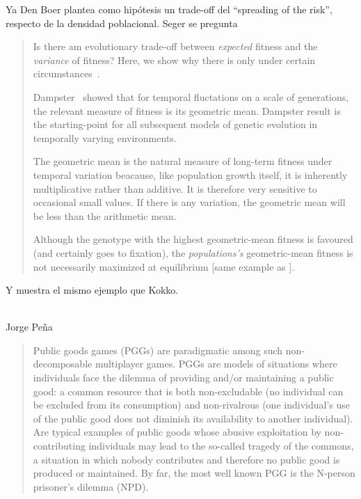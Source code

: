 \documentclass[a4paper,10pt]{article}
\begin{document}
Ya Den Boer plantea como hipótesis un trade-off del ``spreading of the risk'', respecto de la densidad poblacional.
Seger se pregunta
\begin{quotation}
    Is there am evolutionary trade-off between \emph{expected} fitness and the \emph{variance} of fitness?
    Here, we show why there is only under certain circumstances~\cite{seger1987-betHedging}.

    Dampster~\cite{dempster1955-geometricMean} showed that for temporal fluctations on a scale of generations, the relevant measure of fitness is its geometric mean.
    Dampster result is the starting-point for all subsequent models of genetic evolution in temporally varying environments.

    The geometric mean is the natural measure of long-term fitness under temporal variation beacause, like population growth itself, it is inherently multiplicative rather than additive.
    It is therefore very sensitive to occasional small values.
    If there is any variation, the geometric mean will be less than the arithmetic mean.

    Although the genotype with the highest geometric-mean fitness is favoured (and certainly goes to fixation), the \emph{populations's} geometric-mean fitness is not necessarily maximized at equilibrium [same example as \cite{starrfelt2012-bet}].
\end{quotation}
Y muestra el mismo ejemplo que Kokko.

\\

Jorge Peña
\begin{quotation}
    Public goods games (PGGs) are paradigmatic among such non-decomposable multiplayer games.
    PGGs are models of situations where individuals face the dilemma of providing and/or maintaining a public good: a common resource that is both non-excludable (no individual can be excluded from its consumption) and non-rivalrous (one individual’s use of the public good does not diminish its availability to another individual).
    Are typical examples of public goods whose abusive exploitation by non-contributing individuals may lead to the so-called tragedy of the commons, a situation in which nobody contributes and therefore no public good is produced or maintained.
    By far, the most well known PGG is the N-person prisoner’s dilemma (NPD). \cite{pena2012-phd}
\end{quotation}

\\
\end{document}
